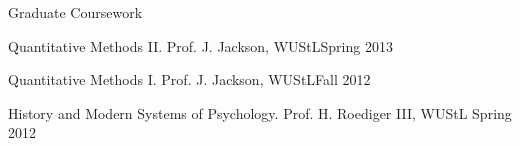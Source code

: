 \documentclass {resume}
\newlength{\wideitemsep}
\let\olditem\item
\renewcommand{\item}{\setlength{\itemsep}{\wideitemsep}\olditem}
\begin{document}
\begin{rSection}{\textrm{Graduate Coursework}}
\begin{etaremune}
\item Quantitative Methods \textrm{II}. Prof. J. Jackson, WUStL\hfill  {Spring 2013}
\item Quantitative Methods \textrm{I}. Prof. J. Jackson, WUStL\hfill  {Fall 2012}
\item History and Modern Systems of Psychology. Prof. H. Roediger \textrm{III}, WUStL \hfill  {Spring 2012}\end{etaremune}
\begin{comment}
{\large \textbf{Supplemental Training}}\\
Data Mining. Prof. R. Stine, Univ. of Michigan\hfill  {Summer 2014}\smallskip\\
Intro. to Human Behavioral Genetics. Coursera, Univ. of Minnesota\hfill{Summer 2014}%
\smallskip\\
Big Data and Social Physics. edX, MIT\hfill{Summer 2014}%
\smallskip\\
Statistical Analysis of fMRI Data. Coursera, Johns Hopkins\hfill{Winter 2014}%
\smallskip\\
Social Epidemiology. Coursera, Univ. of Minnesota\hfill{Summer 2013}%
\vspace{-2mm}\begin{center}\footnotesize{ \textit{upcoming} or \textit{in progress}
}\end{center} \vspace{-4mm}
\end{comment}
\end{rSection}

\end{document}
